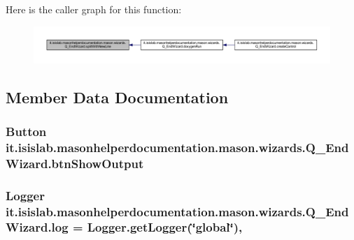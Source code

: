 Here is the caller graph for this function\-:
\nopagebreak
\begin{figure}[H]
\begin{center}
\leavevmode
\includegraphics[width=350pt]{classit_1_1isislab_1_1masonhelperdocumentation_1_1mason_1_1wizards_1_1_q___end_wizard_a1cdec1efdad895973386d4679b790a1c_icgraph}
\end{center}
\end{figure}




\subsection{Member Data Documentation}
\hypertarget{classit_1_1isislab_1_1masonhelperdocumentation_1_1mason_1_1wizards_1_1_q___end_wizard_adabc78dc53c9ffd3c77d6e453db02cb6}{
\subsubsection[{btn\-Show\-Output}]{\setlength{\rightskip}{0pt plus 5cm}Button it.\-isislab.\-masonhelperdocumentation.\-mason.\-wizards.\-Q\-\_\-\-End\-Wizard.\-btn\-Show\-Output\hspace{0.3cm}{\ttfamily [private]}}}\label{classit_1_1isislab_1_1masonhelperdocumentation_1_1mason_1_1wizards_1_1_q___end_wizard_adabc78dc53c9ffd3c77d6e453db02cb6}
\hypertarget{classit_1_1isislab_1_1masonhelperdocumentation_1_1mason_1_1wizards_1_1_q___end_wizard_a032febc0039ba8338e90779e48032ce4}{
\subsubsection[{log}]{\setlength{\rightskip}{0pt plus 5cm}Logger it.\-isislab.\-masonhelperdocumentation.\-mason.\-wizards.\-Q\-\_\-\-End\-Wizard.\-log = Logger.\-get\-Logger(\char`\"{}global\char`\"{})\hspace{0.3cm}{\ttfamily [static]}, {\ttfamily [private]}}}\label{classit_1_1isislab_1_1masonhelperdocumentation_1_1mason_1_1wizards_1_1_q___end_wizard_a032febc0039ba8338e90779e48032ce4}
